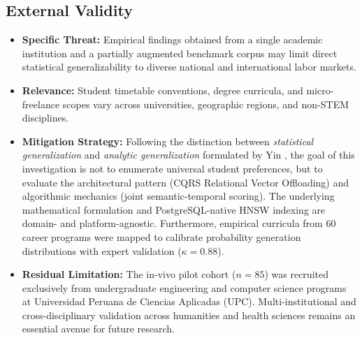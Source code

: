 \documentclass[a4paper,fleqn]{cas-dc}
\begin{document}
\subsection{External Validity}
\begin{itemize}
    \item \textbf{Specific Threat:} Empirical findings obtained from a single academic institution and a partially augmented benchmark corpus may limit direct statistical generalizability to diverse national and international labor markets.
    \item \textbf{Relevance:} Student timetable conventions, degree curricula, and micro-freelance scopes vary across universities, geographic regions, and non-STEM disciplines.
    \item \textbf{Mitigation Strategy:} Following the distinction between \textit{statistical generalization} and \textit{analytic generalization} formulated by Yin \cite{yin2017}, the goal of this investigation is not to enumerate universal student preferences, but to evaluate the architectural pattern (CQRS Relational Vector Offloading) and algorithmic mechanics (joint semantic-temporal scoring). The underlying mathematical formulation and PostgreSQL-native HNSW indexing are domain- and platform-agnostic. Furthermore, empirical curricula from 60 career programs were mapped to calibrate probability generation distributions with expert validation ($\kappa = 0.88$).
    \item \textbf{Residual Limitation:} The in-vivo pilot cohort ($n = 85$) was recruited exclusively from undergraduate engineering and computer science programs at Universidad Peruana de Ciencias Aplicadas (UPC). Multi-institutional and cross-disciplinary validation across humanities and health sciences remains an essential avenue for future research.
\end{itemize}
\end{document}
